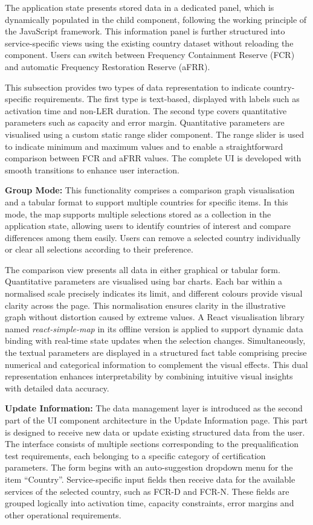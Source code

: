 The application state presents stored data in a dedicated panel, which is dynamically populated in the child component, following the working principle of the JavaScript framework. This information panel is further structured into service-specific views using the existing country dataset without reloading the component. Users can switch between Frequency Containment Reserve (FCR) and automatic Frequency Restoration Reserve (aFRR).

This subsection provides two types of data representation to indicate country-specific requirements. The first type is text-based, displayed with labels such as activation time and non-LER duration. The second type covers quantitative parameters such as capacity and error margin. Quantitative parameters are visualised using a custom static range slider component. The range slider is used to indicate minimum and maximum values and to enable a straightforward comparison between FCR and aFRR values. The complete UI is developed with smooth transitions to enhance user interaction.

\textbf{Group Mode:} This functionality comprises a comparison graph visualisation and a tabular format to support multiple countries for specific items. In this mode, the map supports multiple selections stored as a collection in the application state, allowing users to identify countries of interest and compare differences among them easily. Users can remove a selected country individually or clear all selections according to their preference.

The comparison view presents all data in either graphical or tabular form. Quantitative parameters are visualised using bar charts. Each bar within a normalised scale precisely indicates its limit, and different colours provide visual clarity across the page. This normalisation ensures clarity in the illustrative graph without distortion caused by extreme values. A React visualisation library named \textit{react-simple-map} in its offline version is applied to support dynamic data binding with real-time state updates when the selection changes. Simultaneously, the textual parameters are displayed in a structured fact table comprising precise numerical and categorical information to complement the visual effects. This dual representation enhances interpretability by combining intuitive visual insights with detailed data accuracy.

\textbf{Update Information:} The data management layer is introduced as the second part of the UI component architecture in the Update Information page. This part is designed to receive new data or update existing structured data from the user. The interface consists of multiple sections corresponding to the prequalification test requirements, each belonging to a specific category of certification parameters. The form begins with an auto-suggestion dropdown menu for the item ``Country''. Service-specific input fields then receive data for the available services of the selected country, such as FCR-D and FCR-N. These fields are grouped logically into activation time, capacity constraints, error margins and other operational requirements.

